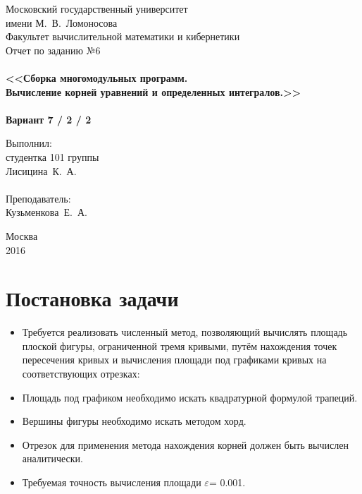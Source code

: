 \documentclass[a4paper,12pt,titlepage,finall]{article}
\begin{document}
\begin{titlepage}
    \begin{center}
	{\small \sc Московский государственный университет \\имени М.~В.~Ломоносова\\
	Факультет вычислительной математики и кибернетики\\}
	\vfill
	{\Large \sc Отчет по заданию №6}\\
	~\\
	{\large \bf <<Сборка многомодульных программ. \\
	Вычисление корней уравнений и определенных интегралов.>>}\\ 
	~\\
	{\large \bf Вариант 7 / 2 / 2}
    \end{center}
    \begin{flushright}
	\vfill {Выполнил:\\
	студентка 101 группы\\
	Лисицина~К.~А.\\
	~\\
	Преподаватель:\\
	Кузьменкова~Е.~А.}
    \end{flushright}
    \begin{center}
	\vfill
	{\small Москва\\2016}
    \end{center}
\end{titlepage}

\tableofcontents
\newpage

\section{Постановка задачи}
\begin{itemize}
\item Требуется реализовать численный метод, позволяющий вычислять площадь плоской фигуры, ограниченной тремя кривыми, путём нахождения точек пересечения кривых и вычисления площади под графиками кривых на соответствующих отрезках:
\item Площадь под графиком необходимо искать квадратурной формулой трапеций.
\item Вершины фигуры необходимо искать методом хорд.
\item Отрезок для применения метода нахождения корней должен быть вычислен аналитически.
\item Требуемая точность вычисления площади $\varepsilon$= 0.001.
\end{itemize}
\end{document}

